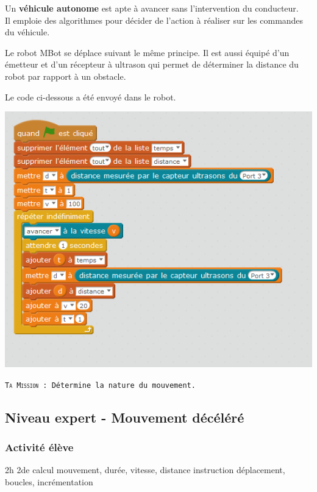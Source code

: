 \begin{eleve}
    
    Un \textbf{véhicule autonome} est apte à avancer sans l'intervention du conducteur.\\
    Il emploie des algorithmes pour décider de l'action à réaliser sur les commandes du véhicule.
    
    Le robot MBot se déplace suivant le même principe. Il est aussi équipé d'un émetteur et d'un récepteur à ultrason qui permet de déterminer la distance du robot par rapport à un obstacle.
    
    Le code ci-dessous a été envoyé dans le robot.
    \begin{center}
            \includegraphics[width=0.75\linewidth]{res/mbot-nature01.png}
    \end{center}
    
    \texttt{\textsc{Ta Mission} :
    Détermine la nature du mouvement.}
\end{eleve}


\newpage

\subsection{Niveau expert - Mouvement décéléré}

\subsubsection{Activité élève}

\cartouche
{2h}         %
{2de}         %
{calcul}        %
{mouvement, durée, vitesse, distance}     %
{instruction déplacement, boucles, incrémentation}       %


